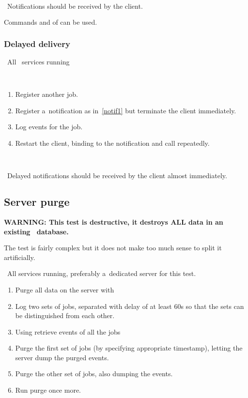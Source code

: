 \how\ 

\result\ Notifications should be received by the client.

\begin{hints}
Commands  and  of 
can be used.
\end{hints}




\subsubsection{Delayed delivery}

\req\ All \LB\ services running

\what\
\begin{enumerate}
\item Register another job.
\item Register a~notification as in~\ref{notif1} but terminate the client
immediately.
\item Log events for the job.
\item Restart the client, binding to the notification and call
 repeatedly.
\end{enumerate}

\how\ 

\result\ Delayed notifications should be received by the client almost
immediately.




\subsection{Server purge}

\textbf{WARNING: This test is destructive, it destroys ALL data in an
existing \LB\ database.}

The test is fairly complex but it does not make too much sense to split it
artificially.

\req\ All \LB services running, preferably a~dedicated server for this test.

\what
\begin{enumerate}
\item Purge all data on the server with 
\item Log two sets of jobs, separated with delay of at least 60s so
that the sets can be distinguished from each other.
\item \label{purgel}
Using  retrieve events of all the jobs
\item \label{purge1}
Purge the first set of jobs (by specifying appropriate timestamp),
letting the server dump the purged events.
\item \label{purge2} Purge the other set of jobs, also dumping the events.
\item \label{purge3} Run purge once more.
\end{enumerate}

